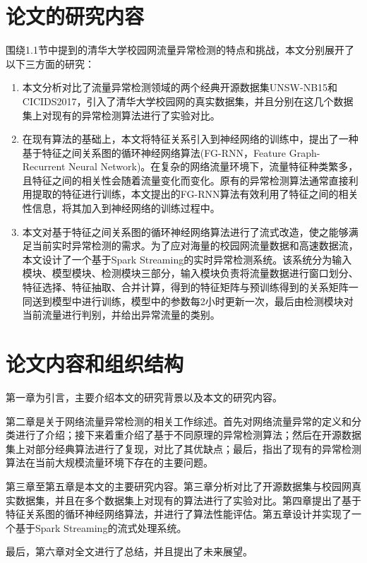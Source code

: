 \section{论文的研究内容}
围绕1.1节中提到的清华大学校园网流量异常检测的特点和挑战，本文分别展开了以下三方面的研究：
\begin{enumerate}
  \item 本文分析对比了流量异常检测领域的两个经典开源数据集UNSW-NB15和CICIDS2017，引入了清华大学校园网的真实数据集，并且分别在这几个数据集上对现有的异常检测算法进行了实验对比。
    \item 在现有算法的基础上，本文将特征关系引入到神经网络的训练中，提出了一种基于特征之间关系图的循环神经网络算法(FG-RNN，Feature Graph-Recurrent Neural Network)。在复杂的网络流量环境下，流量特征种类繁多，且特征之间的相关性会随着流量变化而变化。原有的异常检测算法通常直接利用提取的特征进行训练，本文提出的FG-RNN算法有效利用了特征之间的相关性信息，将其加入到神经网络的训练过程中。
    \item 本文对基于特征之间关系图的循环神经网络算法进行了流式改造，使之能够满足当前实时异常检测的需求。为了应对海量的校园网流量数据和高速数据流，本文设计了一个基于Spark Streaming的实时异常检测系统。该系统分为输入模块、模型模块、检测模块三部分，输入模块负责将流量数据进行窗口划分、特征选择、特征抽取、合并计算，得到的特征矩阵与预训练得到的关系矩阵一同送到模型中进行训练，模型中的参数每2小时更新一次，最后由检测模块对当前流量进行判别，并给出异常流量的类别。

\end{enumerate}

\section{论文内容和组织结构}
第一章为引言，主要介绍本文的研究背景以及本文的研究内容。

第二章是关于网络流量异常检测的相关工作综述。首先对网络流量异常的定义和分类进行了介绍；接下来着重介绍了基于不同原理的异常检测算法；然后在开源数据集上对部分经典算法进行了复现，对比了其优缺点；最后，指出了现有的异常检测算法在当前大规模流量环境下存在的主要问题。

第三章至第五章是本文的主要研究内容。第三章分析对比了开源数据集与校园网真实数据集，并且在多个数据集上对现有的算法进行了实验对比。第四章提出了基于特征关系图的循环神经网络算法，并进行了算法性能评估。第五章设计并实现了一个基于Spark Streaming的流式处理系统。

最后，第六章对全文进行了总结，并且提出了未来展望。
